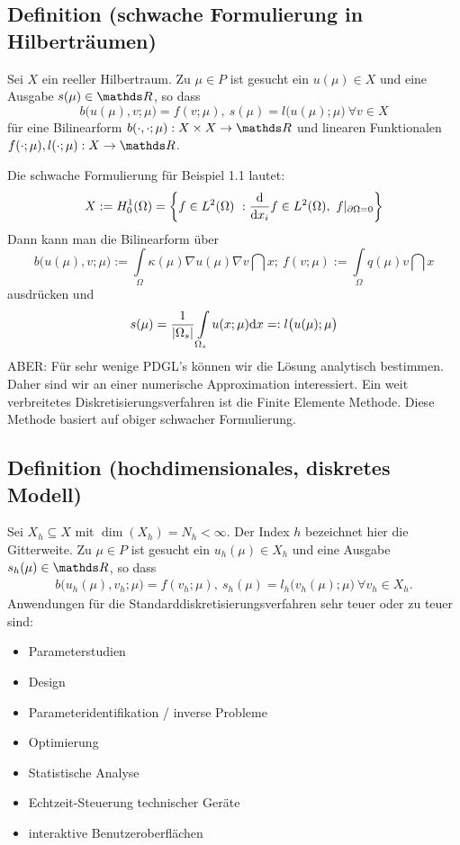 \subsection{Definition (schwache Formulierung in Hilberträumen)}
\label{sub:def_hilbert}
Sei $X$ ein reeller Hilbertraum.
Zu $\mu\in P$ ist gesucht ein $u(\mu)\in X$ und eine Ausgabe $s(\mu)\in \R$, so dass
\[
b\big(u(\mu),v;\mu\big) = f(v;\mu), ~ s(\mu) = l\big(u(\mu);\mu\big)~\forall v\in X
\]
für eine Bilinearform $b(\cdot,\cdot;\mu): X\times X \to \R$ und linearen Funktionalen $f(\cdot;\mu),l(\cdot;\mu):X\to \R$.

Die schwache Formulierung für Beispiel 1.1 lautet:
\[
X:= H_0^1(\Omega)= \left\lbrace f\in L^2(\Omega)~:\frac{\mathrm{d}  }{\mathrm{d} x_i} f\in L^2(\Omega),~f|_{\partial \Omega = 0} \right\rbrace
\]
Dann kann man die Bilinearform über
\[
b\big(u(\mu),v;\mu\big) := \int\limits_{\Omega} \kappa(\mu)\nabla u(\mu)\nabla v \dint x;~ f(v;\mu) := \int\limits_{\Omega} q(\mu) v \dint x
\]
ausdrücken und 
\[
s(\mu) = \frac{1}{\left\vert\Omega_s\right\vert} \int\limits_{\Omega_s} u(x;\mu)\mathrm{d} x =: l\big(u(\mu);\mu\big)
\]
ABER: Für sehr wenige PDGL's können wir die Lösung analytisch bestimmen.
Daher sind wir an einer numerische Approximation interessiert.
Ein weit verbreitetes Diskretisierungsverfahren ist die Finite Elemente Methode.
Diese Methode basiert auf obiger schwacher Formulierung.

\subsection{Definition (hochdimensionales, diskretes Modell)}
\label{sub:def_hochdim}
Sei $X_h\subseteq X$ mit $\dim(X_h) =N_h < \infty$.
Der Index $h$ bezeichnet hier die Gitterweite.
Zu $\mu\in P$ ist gesucht ein $u_h(\mu)\in X_h$ und eine Ausgabe $s_h(\mu)\in \R$, so dass
\begin{align}
b\big(u_h(\mu),v_h;\mu\big) = f(v_h;\mu), ~ s_h(\mu)= l_h\big(v_h(\mu);\mu\big)~\forall v_h\in X_h.
\end{align}
Anwendungen für die Standarddiskretisierungsverfahren sehr teuer oder zu teuer sind:
\begin{itemize}
	\item Parameterstudien
	\item Design
	\item Parameteridentifikation / inverse Probleme
	\item Optimierung
	\item Statistische Analyse
\end{itemize}
\begin{itemize}
	\item Echtzeit-Steuerung technischer Geräte
	\item interaktive Benutzeroberflächen
\end{itemize}

